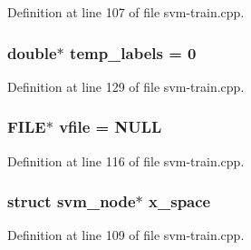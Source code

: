 Definition at line 107 of file svm-\/train.\-cpp.

\hypertarget{svm-train_8cpp_a8d832079d5b980f5955dcd7afc689ba9}{
\subsubsection[{temp\-\_\-labels}]{\setlength{\rightskip}{0pt plus 5cm}double$\ast$ temp\-\_\-labels = 0}}\label{svm-train_8cpp_a8d832079d5b980f5955dcd7afc689ba9}


Definition at line 129 of file svm-\/train.\-cpp.

\hypertarget{svm-train_8cpp_a32ca8324fdbaa5886494c3794aabb98e}{
\subsubsection[{vfile}]{\setlength{\rightskip}{0pt plus 5cm}F\-I\-L\-E$\ast$ vfile = N\-U\-L\-L}}\label{svm-train_8cpp_a32ca8324fdbaa5886494c3794aabb98e}


Definition at line 116 of file svm-\/train.\-cpp.

\hypertarget{svm-train_8cpp_aee6e5726660b16e12499d9bfa6eef01f}{
\subsubsection[{x\-\_\-space}]{\setlength{\rightskip}{0pt plus 5cm}struct {\bf svm\-\_\-node}$\ast$ x\-\_\-space}}\label{svm-train_8cpp_aee6e5726660b16e12499d9bfa6eef01f}


Definition at line 109 of file svm-\/train.\-cpp.

